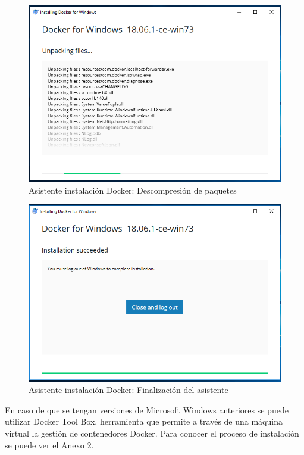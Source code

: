 \begin{figure}[!hbtp]
	\centering
	\includegraphics[width=\linewidth]{Trabajo/RecursosEducativos/RE05_Docker/Instalacion_Windows/REDocker_Instalacion_Windows03.png}
	\vspace{-0.2cm}
	\caption{Asistente instalación Docker: Descompresión de paquetes}
	\label{fig:InstalacionDockerWin3}
\end{figure}

\begin{figure}[!hbtp]
	\centering
	\includegraphics[width=\linewidth]{Trabajo/RecursosEducativos/RE05_Docker/Instalacion_Windows/REDocker_Instalacion_Windows04.png}
	\vspace{-0.2cm}
	\caption{Asistente instalación Docker: Finalización del asistente}
	\label{fig:InstalacionDockerWin4}
\end{figure}

En caso de que se tengan versiones de Microsoft Windows anteriores se puede utilizar Docker Tool Box, herramienta que permite a través de una máquina virtual la gestión de contenedores Docker. Para conocer el proceso de instalación se puede ver el Anexo 2.
